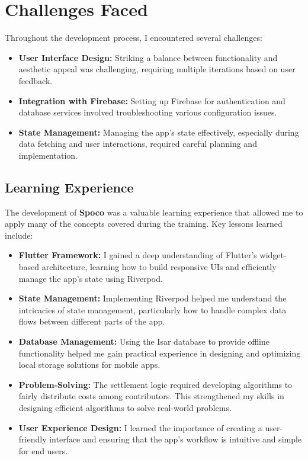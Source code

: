 \documentclass[12pt,a4paper]{report}
\begin{document}
\section{Challenges Faced}
Throughout the development process, I encountered several challenges:

\begin{itemize}
    \item \textbf{User Interface Design: } Striking a balance between functionality and aesthetic appeal was challenging, requiring multiple iterations based on user feedback.
    \item \textbf{Integration with Firebase:} Setting up Firebase for authentication and database services involved troubleshooting various configuration issues.
    \item \textbf{State Management:} Managing the app's state effectively, especially during data fetching and user interactions, required careful planning and implementation.
\end{itemize}



\subsection{Learning Experience}
The development of \textbf{Spoco} was a valuable learning experience that allowed me to apply many of the concepts covered during the training. Key lessons learned include:

\begin{itemize}
    \item \textbf{Flutter Framework:} I gained a deep understanding of Flutter's widget-based architecture, learning how to build responsive UIs and efficiently manage the app's state using Riverpod.
    \item \textbf{State Management:} Implementing Riverpod helped me understand the intricacies of state management, particularly how to handle complex data flows between different parts of the app.
    \item \textbf{Database Management:} Using the Isar database to provide offline functionality helped me gain practical experience in designing and optimizing local storage solutions for mobile apps.
    \item \textbf{Problem-Solving:} The settlement logic required developing algorithms to fairly distribute costs among contributors. This strengthened my skills in designing efficient algorithms to solve real-world problems.
    \item \textbf{User Experience Design:} I learned the importance of creating a user-friendly interface and ensuring that the app’s workflow is intuitive and simple for end users.
\end{itemize}
\end{document}
